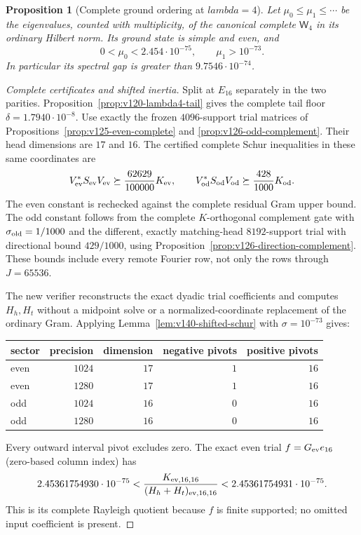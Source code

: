\documentclass[11pt]{article}
\def\lambda{lambda}%
\newtheorem{proposition}[theorem]{Proposition}
\theoremstyle{remark}
\begin{document}
\begin{proposition}[Complete ground ordering at $\lambda=4$]
\label{prop:v140-ground4}
Let $\mu_0\le\mu_1\le\cdots$ be the eigenvalues, counted with
multiplicity, of the canonical complete $\mathsf W_4$ in its ordinary
Hilbert norm. Its ground state is simple and even, and
\begin{equation}\label{eq:v140-ground4-bounds}
 0<\mu_0<2.454\cdot10^{-75},\qquad \mu_1>10^{-73}.
\end{equation}
In particular its spectral gap is greater than $9.7546\cdot10^{-74}$.
\end{proposition}
\begin{proof}[Complete certificates and shifted inertia]
Split at $E_{16}$ separately in the two parities.
Proposition~\ref{prop:v120-lambda4-tail} gives the complete tail floor
$\delta=1.7940\cdot10^{-8}$. Use exactly the frozen $4096$-support
trial matrices of Propositions~\ref{prop:v125-even-complete} and
\ref{prop:v126-odd-complement}. Their head dimensions are $17$ and
$16$. The certified complete Schur inequalities in these same
coordinates are
\[
 V_{\rm ev}^*S_{\rm ev}V_{\rm ev}\succeq
       \frac{62629}{100000}K_{\rm ev},\qquad
 V_{\rm od}^*S_{\rm od}V_{\rm od}\succeq
       \frac{428}{1000}K_{\rm od}.
\]
The even constant is rechecked against the complete residual Gram
upper bound. The odd constant follows from the complete
$K$-orthogonal complement gate with $\sigma_{\rm old}=1/1000$
and the different, exactly matching-head $8192$-support trial with
directional bound $429/1000$, using
Proposition~\ref{prop:v126-direction-complement}. These bounds include
every remote Fourier row, not only the rows through $J=65536$.

The new verifier reconstructs the exact dyadic trial coefficients
and computes $H_h,H_t$ without a midpoint solve or a normalized-coordinate
replacement of the ordinary Gram. Applying
Lemma~\ref{lem:v140-shifted-schur} with $\sigma=10^{-73}$ gives:
\begin{center}
\begin{tabular}{lrrrr}
\toprule
sector & precision & dimension & negative pivots & positive pivots\\
\midrule
even & $1024$ & $17$ & $1$ & $16$\\
even & $1280$ & $17$ & $1$ & $16$\\
odd & $1024$ & $16$ & $0$ & $16$\\
odd & $1280$ & $16$ & $0$ & $16$\\
\bottomrule
\end{tabular}
\end{center}
Every outward interval pivot excludes zero. The exact even trial
$f=G_{\rm ev}e_{16}$ (zero-based column index) has
\[
 2.45361754930\cdot10^{-75}
 <\frac{K_{{\rm ev},16,16}}{(H_h+H_t)_{{\rm ev},16,16}}
 <2.45361754931\cdot10^{-75}.
\]
This is its complete Rayleigh quotient because $f$ is finite
supported; no omitted input coefficient is present.


\end{proof}
\end{document}
